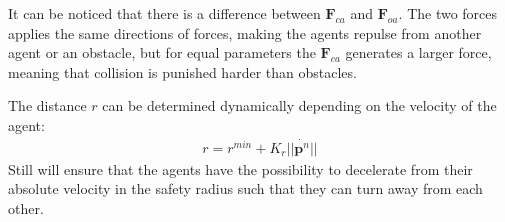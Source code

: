 \documentclass[a4paper,conference]{IEEEtran}
\begin{document}
It can be noticed that there is a difference between $\mathbf{F}_{ca}$
and $\mathbf{F}_{oa}$. The two forces applies the same directions of
forces, making the agents repulse from another agent or an obstacle, but for equal parameters the $\mathbf{F}_{ca}$ generates a larger force, meaning that collision is punished harder than obstacles. 




The distance $r$ can be determined
dynamically depending on the velocity of the agent:
\begin{align}
r = r^{min} + K_r||\dot{\mathbf{p}^n}||
\end{align}
Still will ensure that the agents have the possibility to decelerate
from their absolute velocity in the safety radius such that they can
turn away from each other.
\end{document}
